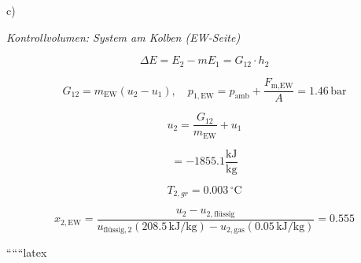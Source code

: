 c) 

\textit{Kontrollvolumen: System am Kolben (EW-Seite)}

\[
\Delta E = E_2 - m E_1 = G_{12} \cdot h_2
\]

\[
G_{12} = m_{\text{EW}} (u_2 - u_1), \quad p_{1,\text{EW}} = p_{\text{amb}} + \frac{F_{\text{m,EW}}}{A} = 1.46 \, \text{bar}
\]

\[
u_2 = \frac{G_{12}}{m_{\text{EW}}} + u_1
\]

\[
= -1855.1 \frac{\text{kJ}}{\text{kg}}
\]

\[
T_{2,gr} = 0.003 \, ^\circ \text{C}
\]

\[
x_{2,\text{EW}} = \frac{u_2 - u_{2,\text{flüssig}}}{u_{\text{flüssig},2} (208.5 \, \text{kJ/kg}) - u_{2,\text{gas}} (0.05 \, \text{kJ/kg})} = 0.555
\]

``````latex